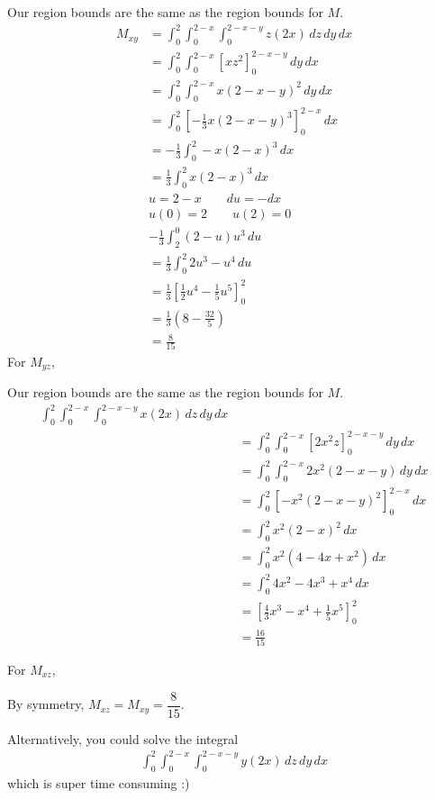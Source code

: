 \documentclass{article}
\newcommand{\lrp}[1]{\left( #1 \right)}
\newcommand{\lrb}[1]{\left[ #1 \right]}
\begin{document}
Our region bounds are the same as the region bounds for $M$.
\begin{align*}
    M_{xy}&=\int_0^2\int_0^{2-x}\int_0^{2-x-y} z(2x)\,dz\,dy\,dx\\
    &=\int_0^2\int_0^{2-x}\lrb{xz^2}_0^{2-x-y}\,dy\,dx\\
    &=\int_0^2 \int_0^{2-x}x(2-x-y)^2\,dy\,dx\\
    &=\int_0^2\lrb{-\frac{1}{3}x(2-x-y)^3}_0^{2-x}\,dx\\
    &=-\frac{1}{3}\int_0^2 -x(2-x)^3\,dx\\
    &=\frac{1}{3}\int_0^2 x (2-x)^3\,dx\\
    &u=2-x\hspace{2em}du=-dx\\
    &u(0)=2\hspace{2em}u(2)=0\\
    &-\frac{1}{3}\int_2^0 (2-u)u^3\,du\\
    &=\frac{1}{3}\int_0^2 2u^3-u^4\,du\\
    &=\frac{1}{3}\lrb{\frac{1}{2}u^4-\frac{1}{5}u^5}_0^2\\
    &=\frac{1}{3}\lrp{8-\frac{32}{5}}\\
    &=\frac{8}{15}
\end{align*}
For $M_{yz}$,

Our region bounds are the same as the region bounds for $M$.
\begin{align*}
    \int_0^2\int_0^{2-x}\int_0^{2-x-y}x(2x)\,dz\,dy\,dx\\
    &=\int_0^2\int_0^{2-x}\lrb{2x^2z}_0^{2-x-y}\,dy\,dx\\
    &=\int_0^2\int_0^{2-x} 2x^2(2-x-y)\,dy\,dx\\
    &=\int_0^2\lrb{-x^2(2-x-y)^2}_0^{2-x}\,dx\\
    &=\int_0^2 x^2(2-x)^2\,dx\\
    &=\int_0^2 x^2(4-4x+x^2)\,dx\\
    &=\int_0^2 4x^2 -4x^3 + x^4\,dx\\
    &=\lrb{\frac{4}{3}x^3-x^4+\frac{1}{5}x^5}_0^2\\
    &=\frac{16}{15}
\end{align*}

For $M_{xz}$,

By symmetry, $M_{xz}=M_{xy}=\dfrac{8}{15}$.

Alternatively, you could solve the integral
\begin{align*}
     \int_0^2\int_0^{2-x}\int_0^{2-x-y} y(2x)\,dz\,dy\,dx
\end{align*}
which is super time consuming :)
\end{document}

